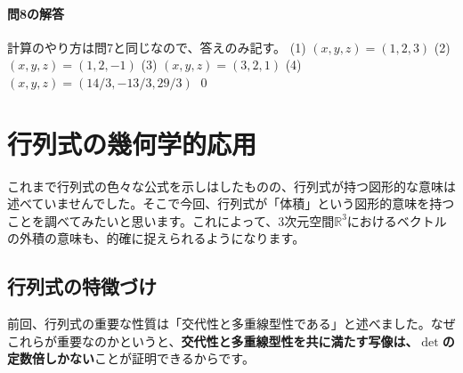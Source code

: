 \paragraph{問8の解答} 計算のやり方は問7と同じなので、答えのみ記す。
(1) $(x, y, z) = (1, 2, 3)$ 
(2) $(x, y, z) = (1, 2, -1)$ 
(3) $(x, y, z) = (3, 2, 1)$ 
(4) $(x, y, z) = (14/3, -13/3, 29/3)$ \qed

\section{行列式の幾何学的応用}

これまで行列式の色々な公式を示しはしたものの、行列式が持つ図形的な意味は述べていませんでした。そこで今回、行列式が「体積」という図形的意味を持つことを調べてみたいと思います。これによって、$3$次元空間$\mathbb{R}^3$におけるベクトルの外積の意味も、的確に捉えられるようになります。

\subsection{行列式の特徴づけ}

前回、行列式の重要な性質は「交代性と多重線型性である」と述べました。なぜこれらが重要なのかというと、\textbf{交代性と多重線型性を共に満たす写像は、$\det$の定数倍しかない}ことが証明できるからです。


